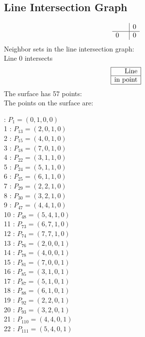 \documentclass{article}
\begin{document}
{\subsection*{Line Intersection Graph}
{\arraycolsep=1pt
$$
\begin{array}{rr|*{1}r}
 &  & 0\\
\hline
0 &  & 0\\
\end{array}
$$
}%
Neighbor sets in the line intersection graph:\\
Line 0 intersects 
$$
\begin{array}{|r*{0}{|c}|}
\hline
\mbox{Line} \\
\hline
\mbox{in point} \\
\hline
\end{array}
$$
The surface has 57 points:\\
The points on the surface are:\\
\begin{multicols}{3}
 : $P_{1}=( 0, 1, 0, 0 )$\\
1 : $P_{13}=( 2, 0, 1, 0 )$\\
2 : $P_{15}=( 4, 0, 1, 0 )$\\
3 : $P_{18}=( 7, 0, 1, 0 )$\\
4 : $P_{22}=( 3, 1, 1, 0 )$\\
5 : $P_{24}=( 5, 1, 1, 0 )$\\
6 : $P_{25}=( 6, 1, 1, 0 )$\\
7 : $P_{29}=( 2, 2, 1, 0 )$\\
8 : $P_{30}=( 3, 2, 1, 0 )$\\
9 : $P_{47}=( 4, 4, 1, 0 )$\\
10 : $P_{48}=( 5, 4, 1, 0 )$\\
11 : $P_{73}=( 6, 7, 1, 0 )$\\
12 : $P_{74}=( 7, 7, 1, 0 )$\\
13 : $P_{76}=( 2, 0, 0, 1 )$\\
14 : $P_{78}=( 4, 0, 0, 1 )$\\
15 : $P_{81}=( 7, 0, 0, 1 )$\\
16 : $P_{85}=( 3, 1, 0, 1 )$\\
17 : $P_{87}=( 5, 1, 0, 1 )$\\
18 : $P_{88}=( 6, 1, 0, 1 )$\\
19 : $P_{92}=( 2, 2, 0, 1 )$\\
20 : $P_{93}=( 3, 2, 0, 1 )$\\
21 : $P_{110}=( 4, 4, 0, 1 )$\\
22 : $P_{111}=( 5, 4, 0, 1 )$\\

\end{multicols}}
\end{document}
